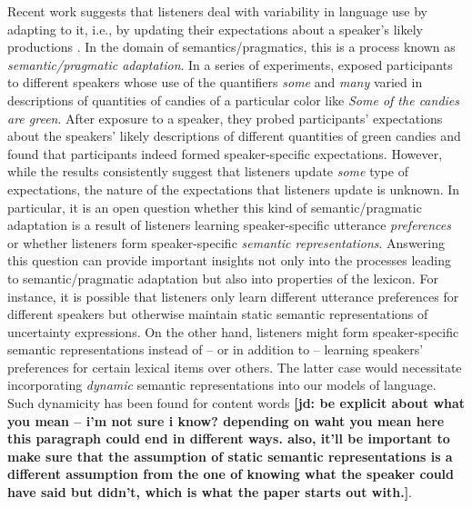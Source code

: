 \documentclass[man, floatsintext]{apa6}
\newcommand{\jd}[1]{\textcolor{PinkyPurple}{\textbf{[jd: #1]}}}
\begin{document}
Recent work suggests that listeners deal with variability in language use by adapting to it, i.e., by updating their expectations about a speaker's likely productions \parencite[e.g.,][]{Norris2003,Kraljic2005,Kleinschmidt2015,Kamide2012,Fine2016}. In the domain of semantics/pragmatics, this is a process known as \emph{semantic/pragmatic adaptation}. In a series of experiments, \textcite{Yildirim2016} exposed participants to different speakers whose use of the quantifiers \textit{some} and \textit{many} varied in descriptions of quantities of candies of a particular color like \emph{Some of the candies are green}. After exposure to a speaker, they probed participants' expectations about the speakers' likely descriptions of different quantities of green candies and found that participants indeed formed speaker-specific expectations. However, while the results consistently suggest that listeners update \textit{some} type of expectations, the nature of the expectations that listeners update is unknown. 
In particular, it is an open question whether this kind of semantic/pragmatic adaptation is a result of listeners learning speaker-specific utterance \emph{preferences} or whether listeners form speaker-specific \emph{semantic representations}. 
Answering this question can provide important insights not only into the processes leading to semantic/pragmatic adaptation but also into properties of the lexicon. For instance, it is possible that listeners only learn different utterance preferences for different speakers but otherwise maintain static semantic representations of uncertainty expressions. On the other hand, listeners might form speaker-specific semantic representations instead of -- or in addition to -- learning speakers' preferences for certain lexical items over others. The latter case would necessitate incorporating \emph{dynamic} semantic representations into our models of language.  Such dynamicity has been found for content words \parencite[e.g.,][]{Clark1983} \jd{be explicit about what you mean -- i'm not sure i know? depending on waht you mean here this paragraph could end in different ways. also, it'll be important to make sure that the assumption of static semantic representations is a different assumption from the one of knowing what the speaker could have said but didn't, which is what the paper starts out with.}. 


\end{document}
